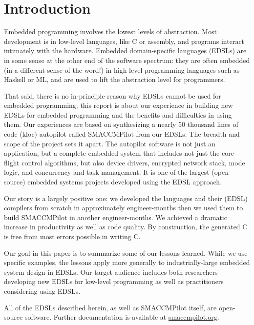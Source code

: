 \section{Introduction}

Embedded programming involves the lowest levels of abstraction.  Most development
is in low-level languages, like C or assembly, and programs interact intimately
with the hardware.  Embedded domain-specific languages (EDSLs) are in
some sense at the other end of the software spectrum: they are often embedded
(in a different sense of the word!) in high-level programming languages such as
Haskell or ML, and are used to lift the abstraction level for programmers.

That said, there is no in-principle reason why EDSLs cannot be used for embedded
programming; this report is about our experience in building new EDSLs for
embedded programming and the benefits and difficulties in using them.  Our
experiences are based on synthesizing a nearly 50 thousand lines of code (kloc)
autopilot called SMACCMPilot from our EDSLs.  The breadth and scope of the
project sets it apart.  The autopilot software is not just an application, but a
complete embedded system that includes not just the core flight control
algorithms, but also device drivers, encrypted network stack, mode logic, and
concurrency and task management.  It is one of the largest (open-source)
embedded systems projects developed using the EDSL approach.

Our story is a largely positive one: we developed the languages and their (EDSL)
compilers from scratch in approximately  engineer-months then we used
them to build SMACCMPilot in another  engineer-months.  We achieved a
dramatic increase in productivity as well as code quality.  By construction, the
generated C is free from most errors possible in writing C.

Our goal in this paper is to summarize some of our lessons-learned.  While we
use specific examples, the lessons apply more generally to industrially-large
embedded system design in EDSLs.  Our target audience includes both researchers
developing new EDSLs for low-level programming as well as practitioners
considering using EDSLs.

All of the EDSLs described herein, as well as SMACCMPilot itself, are
open-source software. Further documentation is available at \url{smaccmpilot.org}.



